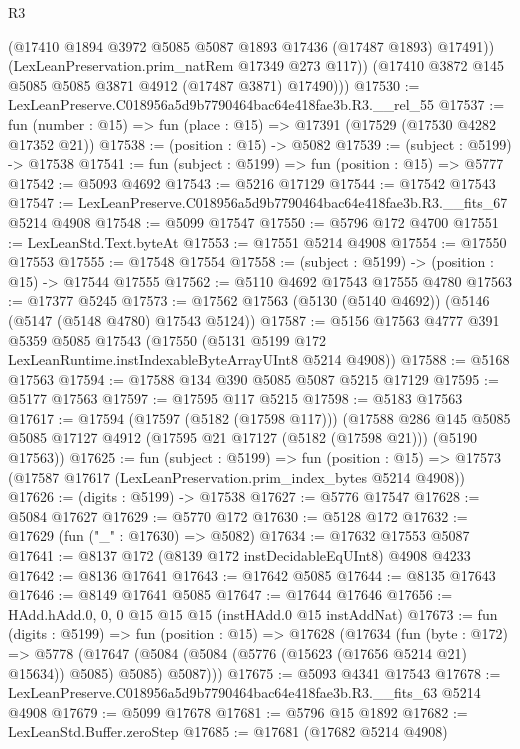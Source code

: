 \begin{lexlean}{R3}
\begin{coremodule}
            (@17410 @1894 @3972 @5085 @5087 @1893 @17436 (@17487 @1893) @17491))
          (LexLeanPreservation.prim_natRem @17349 @273 @117))
        (@17410 @3872 @145 @5085 @5085 @3871 @4912 (@17487 @3871) @17490)))
@17530 := LexLeanPreserve.C018956a5d9b7790464bac64e418fae3b.R3.__rel_55
@17537 := fun (number : @15) => fun (place : @15) => @17391 (@17529 (@17530 @4282 @17352 @21))
@17538 := (position : @15) -> @5082
@17539 := (subject : @5199) -> @17538
@17541 := fun (subject : @5199) => fun (position : @15) => @5777
@17542 := @5093 @4692
@17543 := @5216 @17129
@17544 := @17542 @17543
@17547 := LexLeanPreserve.C018956a5d9b7790464bac64e418fae3b.R3.__fits_67 @5214 @4908
@17548 := @5099 @17547
@17550 := @5796 @172 @4700
@17551 := LexLeanStd.Text.byteAt
@17553 := @17551 @5214 @4908
@17554 := @17550 @17553
@17555 := @17548 @17554
@17558 := (subject : @5199) -> (position : @15) -> @17544 @17555
@17562 := @5110 @4692 @17543 @17555 @4780
@17563 := @17377 @5245
@17573 := @17562 @17563 (@5130 (@5140 @4692)) (@5146 (@5147 (@5148 @4780) @17543 @5124))
@17587 := @5156
    @17563
    @4777
    @391
    @5359
    @5085
    @17543
    (@17550 (@5131 @5199 @172 LexLeanRuntime.instIndexableByteArrayUInt8 @5214 @4908))
@17588 := @5168 @17563
@17594 := @17588 @134 @390 @5085 @5087 @5215 @17129
@17595 := @5177 @17563
@17597 := @17595 @117 @5215
@17598 := @5183 @17563
@17617 := @17594
    (@17597 (@5182 (@17598 @117)))
    (@17588
      @286
      @145
      @5085
      @5085
      @17127
      @4912
      (@17595 @21 @17127 (@5182 (@17598 @21)))
      (@5190 @17563))
@17625 := fun (subject : @5199) =>
  fun (position : @15) => @17573 (@17587 @17617 (LexLeanPreservation.prim_index_bytes @5214 @4908))
@17626 := (digits : @5199) -> @17538
@17627 := @5776 @17547
@17628 := @5084 @17627
@17629 := @5770 @172
@17630 := @5128 @172
@17632 := @17629 (fun ("_" : @17630) => @5082)
@17634 := @17632 @17553 @5087
@17641 := @8137 @172 (@8139 @172 instDecidableEqUInt8) @4908 @4233
@17642 := @8136 @17641
@17643 := @17642 @5085
@17644 := @8135 @17643
@17646 := @8149 @17641 @5085
@17647 := @17644 @17646
@17656 := HAdd.hAdd.{0, 0, 0} @15 @15 @15 (instHAdd.{0} @15 instAddNat)
@17673 := fun (digits : @5199) =>
  fun (position : @15) =>
  @17628
    (@17634
      (fun (byte : @172) =>
      @5778 (@17647 (@5084 (@5084 (@5776 (@15623 (@17656 @5214 @21) @15634)) @5085) @5085) @5087)))
@17675 := @5093 @4341 @17543
@17678 := LexLeanPreserve.C018956a5d9b7790464bac64e418fae3b.R3.__fits_63 @5214 @4908
@17679 := @5099 @17678
@17681 := @5796 @15 @1892
@17682 := LexLeanStd.Buffer.zeroStep
@17685 := @17681 (@17682 @5214 @4908)

\end{coremodule}
\end{lexlean}
